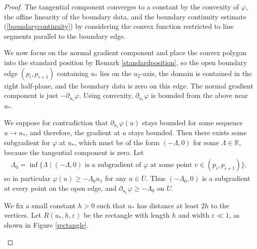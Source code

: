 \documentclass[10pt,a4paper]{amsart}
\begin{document}
\begin{proof}\label{blowupproof}
The tangential component converges to a constant by the convexity of $\varphi$, the affine linearity of the boundary data, and the boundary continuity estimate (\ref{boundarycontinuity}) by considering the convex function restricted to line segments parallel to the boundary edge. 

We now focus on the normal gradient component and place the convex polygon into the standard position by Remark \ref{standardposition}, so the open boundary edge $(p_i, p_{i+1})$ containing $u_*$ lies on the $u_2$-axis, the domain is contained in the right half-plane, and the boundary data is zero on this edge. The normal gradient component is just $-\partial_{u_1}\varphi$. Using convexity, $\partial_{u_1}\varphi$ is bounded from the above near $u_*$.  








We suppose for contradiction that $\partial_{u_1} \varphi (u)$ stays bounded for some sequence $u \to u_*$, and therefore, the gradient at $u$ stays bounded. Then there exists some subgradient for $\varphi$ at $u_*$, which must be of the form $(-\Lambda, 0)$ for some $\Lambda\in \mathbb{R}$, because the tangential component is zero. 
Let 
\begin{align*}
    \Lambda_0 = \inf \{ \Lambda \; | \; (-\Lambda,0) \text{ is a subgradient of } \varphi \text{ at some point } v \in (p_i,p_{i+1})  \},
\end{align*}
so in particular $\varphi(u)\geq -\Lambda_0 u_1$ for any $u\in \overline{U}$. Thus $(-\Lambda_0, 0)$ is a subgradient at every point on the open edge, and $\partial_{u_1} \varphi\geq -\Lambda_0$ on $U$.




We fix a small constant $h > 0$ such that $u_*$ has distance at least $2h$ to the vertices. Let $R(u_*, h, \varepsilon)$ be the rectangle with length $h$ and width $\varepsilon\ll 1$, as shown in Figure \ref{rectangle}.
    \begin{figure}[H]
    

\end{figure}
\end{proof}
\end{document}
